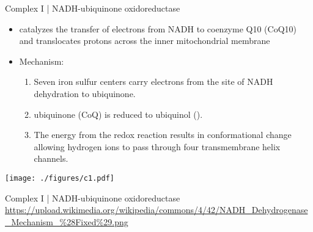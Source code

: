 \documentclass[presentation, smaller]{beamer}
\begin{document}
\begin{frame}[label={sec:org9dd834e}]{Complex I | NADH-ubiquinone oxidoreductase}
\begin{itemize}
\item catalyzes the transfer of electrons from NADH to coenzyme Q10
(CoQ10) and translocates protons across the inner mitochondrial
membrane

\item Mechanism: 
\begin{enumerate}
\item Seven iron sulfur centers carry electrons from the site of NADH
dehydration to ubiquinone.

\item ubiquinone (CoQ) is reduced to ubiquinol ().

\item The energy from the redox reaction results in conformational
change allowing hydrogen ions to pass through four transmembrane
helix channels.
\end{enumerate}
\end{itemize}

\begin{center}
\texttt{[image: ./figures/c1.pdf]}
\end{center}
\end{frame}


\begin{frame}[label={sec:org5c527a3}]{Complex I | NADH-ubiquinone oxidoreductase}
\url{https://upload.wikimedia.org/wikipedia/commons/4/42/NADH\_Dehydrogenase\_Mechanism\_\%28Fixed\%29.png}
\end{frame}
\end{document}
